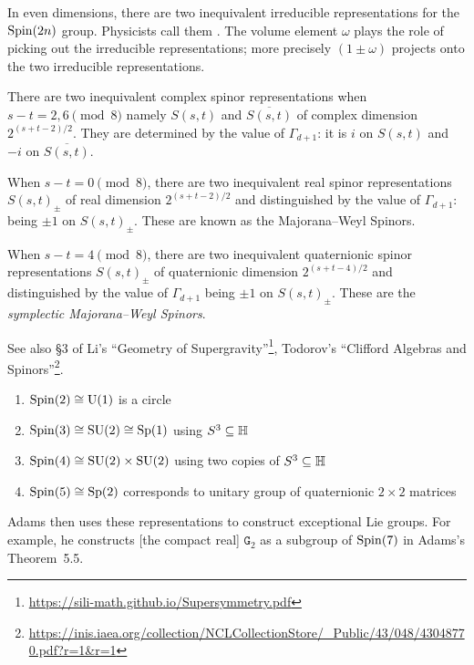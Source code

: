 In even dimensions, there are two inequivalent irreducible
representations for the $\operatorname{Spin}(2n)$ group. Physicists call them
. The volume element $\omega$ plays the role of
picking out the irreducible representations; more precisely
$(1\pm\omega)$ projects onto the two irreducible representations.

\M
There are two inequivalent complex spinor representations when $s-t=2,6\pmod8$
namely $S(s,t)$ and $\overline{S(s,t)}$ of complex dimension
$2^{(s+t-2)/2}$. They are determined by the value of $\Gamma_{d+1}$: it is
$i$ on $S(s,t)$ and $-i$ on $\overline{S(s,t)}$.

When $s-t=0\pmod8$, there are two inequivalent real spinor
representations $S(s,t)_{\pm}$ of real dimension $2^{(s+t-2)/2}$ and
distinguished by the value of $\Gamma_{d+1}$: being $\pm1$ on $S(s,t)_{\pm}$.
These are known as the Majorana--Weyl Spinors.

When $s-t=4\pmod8$, there are two inequivalent quaternionic spinor
representations $S(s,t)_{\pm}$ of quaternionic dimension $2^{(s+t-4)/2}$
and distinguished by the value of $\Gamma_{d+1}$ being $\pm1$ on
$S(s,t)_{\pm}$.
These are the \emph{symplectic Majorana--Weyl Spinors}.

See also \S3 of Li's ``Geometry of Supergravity''\footnote{\url{https://sili-math.github.io/Supersymmetry.pdf}},
Todorov's ``Clifford Algebras and Spinors''\footnote{\url{https://inis.iaea.org/collection/NCLCollectionStore/_Public/43/048/43048770.pdf?r=1&r=1}}.


\begin{example}
\begin{enumerate}
\item $\operatorname{Spin}(2)\cong\operatorname{U}(1)$ is a circle
\item $\operatorname{Spin}(3)\cong\operatorname{SU}(2)\cong\operatorname{Sp}(1)$ using $S^{3}\subseteq\mathbb{H}$
\item $\operatorname{Spin}(4)\cong\operatorname{SU}(2)\times\operatorname{SU}(2)$ using two copies of $S^{3}\subseteq\mathbb{H}$
\item $\operatorname{Spin}(5)\cong\operatorname{Sp}(2)$ corresponds to unitary group of quaternionic
  $2\times2$ matrices
\end{enumerate}
\end{example}

\M
Adams then uses these representations to construct exceptional Lie
groups. For example, he constructs [the compact real] $\mathtt{G}_{2}$
as a subgroup of $\operatorname{Spin}(7)$ in Adams's Theorem~5.5.

